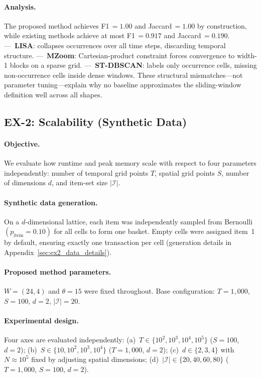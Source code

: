 \paragraph{Analysis.}
The proposed method achieves F1\,$=1.00$ and Jaccard\,$=1.00$ by construction,
while existing methods achieve at most F1\,$=0.917$ and Jaccard\,$=0.190$.
---~\textbf{LISA}: collapses occurrences over all time steps, discarding temporal structure.
---~\textbf{MZoom}: Cartesian-product constraint forces convergence to width-1 blocks on a sparse grid.
---~\textbf{ST-DBSCAN}: labels only occurrence cells, missing non-occurrence cells inside dense windows.
These structural mismatches---not parameter tuning---explain
why no baseline approximates the sliding-window definition well across all shapes.

\subsection{EX-2: Scalability (Synthetic Data)}
\label{sec:ex2}

\paragraph{Objective.}
We evaluate how runtime and peak memory scale
with respect to four parameters independently:
number of temporal grid points $T$,
spatial grid points $S$,
number of dimensions $d$,
and item-set size $|\mathcal{I}|$.

\paragraph{Synthetic data generation.}
On a $d$-dimensional lattice, each item was independently sampled from
Bernoulli$(p_{\mathrm{item}}{=}0.10)$ for all cells to form one basket.
Empty cells were assigned item~1 by default,
ensuring exactly one transaction per cell
(generation details in Appendix~\ref{sec:ex2_data_details}).

\paragraph{Proposed method parameters.}
$W = (24, 4)$ and $\theta = 15$ were fixed throughout.
Base configuration: $T{=}1{,}000$, $S{=}100$, $d{=}2$, $|\mathcal{I}|{=}20$.

\paragraph{Experimental design.}
Four axes are evaluated independently:
(a)~$T \in \{10^2, 10^3, 10^4, 10^5\}$ ($S{=}100$, $d{=}2$);
(b)~$S \in \{10, 10^2, 10^3, 10^4\}$ ($T{=}1{,}000$, $d{=}2$);
(c)~$d \in \{2, 3, 4\}$ with $N{\approx}10^5$ fixed by adjusting spatial dimensions;
(d)~$|\mathcal{I}| \in \{20, 40, 60, 80\}$ ($T{=}1{,}000$, $S{=}100$, $d{=}2$).

